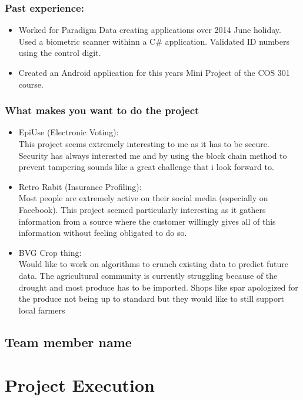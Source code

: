 \documentclass{article}
\begin{document}
	\subsubsection{Past experience:}
	\begin{itemize}
		\item Worked for Paradigm Data creating applications over 2014 June holiday. Used a biometric scanner withinn a C# application. Validated ID numbers using the control digit.
		\item Created an Android application for this years Mini Project of the COS 301 course.
	\end{itemize}

	\subsubsection{What makes you want to do the project}
	\begin{itemize}
		\item EpiUse (Electronic Voting):\\
			This project seems extremely interesting to me as it has to be secure. Security has always interested me and by using the block chain method to prevent tampering sounds like a great challenge that i look forward to.
		\item Retro Rabit (Insurance Profiling):\\
			Most people are extremely active on their social media (especially on Facebook). This project seemed particularly interesting as it gathers information from a source where the customer willingly gives all of this information without feeling obligated to do so.
		\item BVG Crop thing:\\
			Would like to work on algorithms to crunch existing data to predict future data. The agricultural community is currently struggling because of the drought and most produce has to be imported. Shops like spar apologized for the produce not being up to standard but they would like to still support local farmers
	\end{itemize}

	\subsection{Team member name}
	
	\section{Project Execution}
\end{document}
